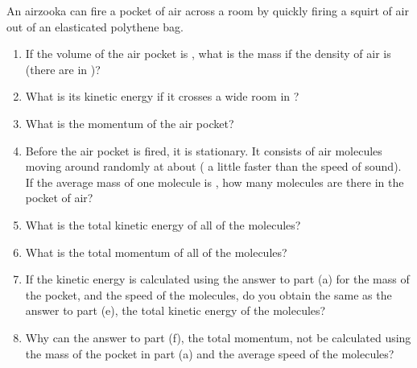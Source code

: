 
\begin{problem}[Robin9]
{An airzooka can fire a pocket of air across a room by quickly firing a squirt of air out of an elasticated polythene bag. 
\begin{enumerate}
	\item If the volume of the air pocket is , what is the mass if the density of air is  (there are  in )?
	\item What is its kinetic energy if it crosses a  wide room in ?
	\item What is the momentum of the air pocket?
	\item Before the air pocket is fired, it is stationary.  It consists of air molecules moving around randomly at about  ( a little faster than the speed of sound).  If the average mass of one molecule is , how many molecules are there in the  pocket of air?
	\item What is the total kinetic energy of all of the molecules?
	\item What is the total momentum of all of the molecules?
	\item If the kinetic energy is calculated using the answer to part (a) for the mass of the pocket, and the  speed of the molecules, do you obtain the same as the answer to part (e), the total kinetic energy of the molecules?
	\item Why can the answer to part (f), the total momentum, not be calculated using the mass of the pocket in part (a) and the  average speed of the molecules?
\end{enumerate}
}
{}
{}
\end{problem}